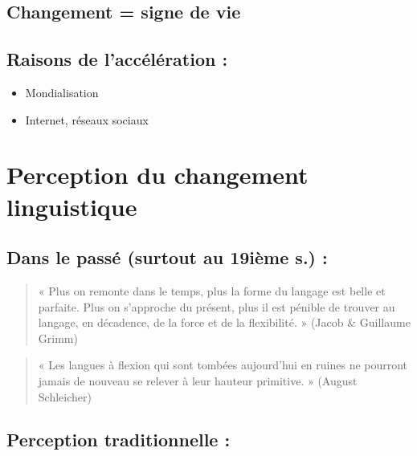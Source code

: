 \documentclass[
  letterpaper,
]{scrbook}
\begin{document}
\hypertarget{changement-signe-de-vie}{%
\subsection{Changement = signe de vie}\label{changement-signe-de-vie}}

\hypertarget{raisons-de-laccuxe9luxe9ration}{%
\subsection{Raisons de l'accélération
:}\label{raisons-de-laccuxe9luxe9ration}}

\begin{itemize}
\item
  Mondialisation
\item
  Internet, réseaux sociaux
\end{itemize}

\hypertarget{section}{%
\section{}\label{section}}

\hypertarget{perception-du-changement-linguistique-1}{%
\section{Perception du changement
linguistique}\label{perception-du-changement-linguistique-1}}

\hypertarget{dans-le-passuxe9-surtout-au-19iuxe8me-s.}{%
\subsection{Dans le passé (surtout au 19ième s.)
:}\label{dans-le-passuxe9-surtout-au-19iuxe8me-s.}}

\begin{quote}
« Plus on remonte dans le temps, plus la forme du langage est belle et
parfaite. Plus on s'approche du présent, plus il est pénible de trouver
au langage, en décadence, de la force et de la flexibilité. » (Jacob \&
Guillaume Grimm)
\end{quote}

\begin{quote}
« Les langues à flexion qui sont tombées aujourd'hui en ruines ne
pourront jamais de nouveau se relever à leur hauteur primitive. »
(August Schleicher)
\end{quote}

\hypertarget{perception-traditionnelle}{%
\subsection{Perception traditionnelle
:}\label{perception-traditionnelle}}
\end{document}

